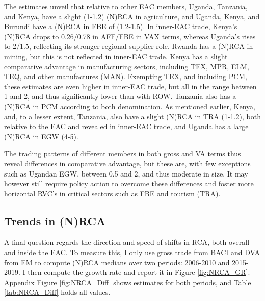 \documentclass[a4paper]{article}
\begin{document}
The estimates unveil that relative to other EAC members, Uganda, Tanzania, and Kenya, have a slight (1-1.2) (N)RCA in agriculture, and Uganda, Kenya, and Burundi have a (N)RCA in FBE of (1.2-1.5). In inner-EAC trade, Kenya's (N)RCA drops to 0.26/0.78 in AFF/FBE in VAX terms, whereas Uganda's rises to 2/1.5, reflecting its stronger regional supplier role. Rwanda has a (N)RCA in mining, but this is not reflected in inner-EAC trade. Kenya has a slight comparative advantage in manufacturing sectors, including TEX, MPR, ELM, TEQ, and other manufactures (MAN). Exempting TEX, and including PCM, these estimates are even higher in inner-EAC trade, but all in the range between 1 and 2, and thus significantly lower than with ROW. Tanzania also has a (N)RCA in PCM according to both denomination. As mentioned earlier, Kenya, and, to a lesser extent, Tanzania, also have a slight (N)RCA in TRA (1-1.2), both relative to the EAC and revealed in inner-EAC trade, and Uganda has a large (N)RCA in EGW (4-5). \newline

The trading patterns of different members in both gross and VA terms thus reveal differences in comparative advantage, but these are, with few exceptions such as Ugandan EGW, between 0.5 and 2, and thus moderate in size. It may however still require policy action to overcome these differences and foster more horizontal RVC's in critical sectors such as FBE and tourism (TRA). 

\subsection{Trends in (N)RCA}

A final question regards the direction and speed of shifts in RCA, both overall and inside the EAC. To measure this, I only use gross trade from BACI and DVA from EM to compute (N)RCA medians over two periods: 2006-2010 and 2015-2019. I then compute the growth rate and report it in Figure \ref{fig:NRCA_GR}. Appendix Figure \ref{fig:NRCA_Diff} shows estimates for both periods, and Table \ref{tab:NRCA_Diff} holds all values. 
\end{document}
